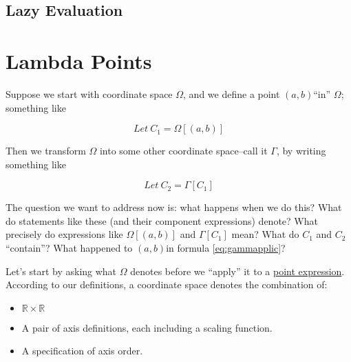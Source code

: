 \documentclass{tufte-handout}
\numberwithin{equation}{subsection}
\newcommand\cspace{coordinate space}
\newcommand\Omg{\(\Omega\)}
\newcommand\origin{\((0,0)\)}
\newcommand\ab{\((a,b)\)}
\begin{document}
\subsection{Lazy Evaluation}
\label{subs:lazy}



\section{Lambda Points}
\label{sec:}

\begin{abstract}
  We use the term \textit{lambda point} to refer to points that have
  been ``added'' to \cspace{}s, in order to distinguish between points
  that are present in the \cspace{} by definition and points that are
  added (inserted, projected, etc.) ``into'' the space.  So if we draw
  a point at \origin{} into space \Omg{}, the result is a space that
  contains the same \origin{} point it had to start with, plus the
  lambda point we projected on to that ``native'' point.
\end{abstract}

Suppose we start with \cspace{} \Omg{}, and we define a point \ab ``in''
\Omg{}; something like

\begin{equation}
  \label{eq:omgapplic}
  Let\ C_1 = \Omega[(a,b)]
\end{equation}

Then we transform \Omg{} into some other \cspace{}--call it \(\Gamma\),
by writing something like

\begin{equation}
  \label{eq:gammapplic}
  Let\ C_2 = \Gamma[C_1]
\end{equation}

The question we want to address now is: what happens when we do this?
What do statements like these (and their component expressions)
denote?  What precisely do expressions like \(\Omega[(a,b)]\) and
\(\Gamma[C_1]\) mean? What do \(C_1\) and \(C_2\) ``contain''?  What
happened to \ab in formula \ref{eq:gammapplic}?

Let's start by asking what \Omg{} denotes before we ``apply'' it to a
\hyperref[subs:pointexprs]{point expression}.  According to our definitions, a \cspace{} denotes
the combination of:

\begin{itemize}
\item \(\mathds{R}\times\mathds{R}\)
\item A pair of axis definitions, each including a scaling function.
\item A specification of axis order.
\end{itemize}
\end{document}
